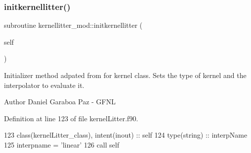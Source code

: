 \subsubsection{\texorpdfstring{initkernellitter()}{initkernellitter()}}
{\footnotesize\ttfamily subroutine kernellitter\+\_\+mod\+::initkernellitter (\begin{DoxyParamCaption}\item[{class(\mbox{\hyperlink{structkernellitter__mod_1_1kernellitter__class}{kernellitter\+\_\+class}}), intent(inout)}]{self }\end{DoxyParamCaption})}



Initializer method adpated from for kernel class. Sets the type of kernel and the interpolator to evaluate it. 

\begin{DoxyAuthor}{Author}
Daniel Garaboa Paz -\/ G\+F\+NL 
\end{DoxyAuthor}


Definition at line 123 of file kernel\+Litter.\+f90.


\begin{DoxyCode}
123     \textcolor{keywordtype}{class}(kernelLitter\_class), \textcolor{keywordtype}{intent(inout)} :: self
124     \textcolor{keywordtype}{type}(string) :: interpName
125     interpname = \textcolor{stringliteral}{'linear'}
126     \textcolor{keyword}{call }self%
\end{DoxyCode}
